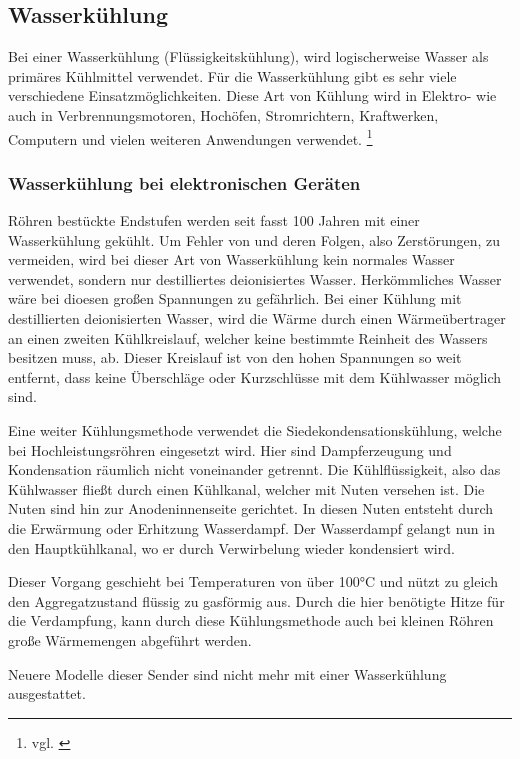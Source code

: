 \newpage

\subsection{Wasserkühlung}  \label{Stand der Technik}

Bei einer Wasserkühlung (Flüssigkeitskühlung), wird logischerweise Wasser als primäres Kühlmittel verwendet. Für die Wasserkühlung gibt es sehr viele verschiedene Einsatzmöglichkeiten. Diese Art von Kühlung wird in Elektro- wie auch in Verbrennungsmotoren, Hochöfen, Stromrichtern, Kraftwerken, Computern und vielen weiteren Anwendungen verwendet. \footnote{vgl. \cite{Wasserkuehlung}}

\subsubsection{Wasserkühlung bei elektronischen Geräten}

Röhren bestückte Endstufen werden seit fasst 100 Jahren mit einer Wasserkühlung gekühlt. Um Fehler von und deren Folgen, also Zerstörungen, zu vermeiden, wird bei dieser Art von Wasserkühlung kein normales Wasser verwendet, sondern nur destilliertes deionisiertes Wasser. Herkömmliches Wasser wäre bei dioesen großen Spannungen zu gefährlich. Bei einer Kühlung mit destillierten deionisierten Wasser, wird die Wärme durch einen Wärmeübertrager an einen zweiten Kühlkreislauf, welcher keine bestimmte Reinheit des Wassers besitzen muss, ab. Dieser Kreislauf ist von den hohen Spannungen so weit entfernt, dass keine Überschläge oder Kurzschlüsse mit dem Kühlwasser möglich sind. 

Eine weiter Kühlungsmethode verwendet die Siedekondensationskühlung, welche bei Hochleistungsröhren eingesetzt wird. Hier sind Dampferzeugung und Kondensation räumlich nicht voneinander getrennt. Die Kühlflüssigkeit, also das Kühlwasser fließt durch einen Kühlkanal, welcher mit Nuten versehen ist. Die Nuten sind hin zur Anodeninnenseite gerichtet.
In diesen Nuten entsteht durch die Erwärmung oder Erhitzung Wasserdampf. Der Wasserdampf gelangt nun in den Hauptkühlkanal, wo er durch Verwirbelung wieder kondensiert wird.

Dieser Vorgang geschieht bei Temperaturen von über 100°C und nützt zu gleich den Aggregatzustand flüssig zu gasförmig aus. Durch die hier benötigte Hitze für die Verdampfung, kann durch diese Kühlungsmethode auch bei kleinen Röhren große Wärmemengen abgeführt werden.

Neuere Modelle dieser Sender sind nicht mehr mit einer Wasserkühlung ausgestattet.

